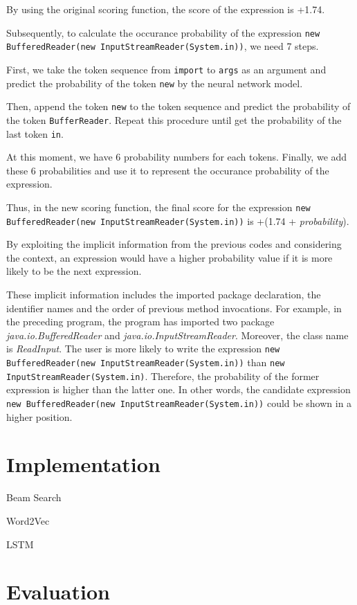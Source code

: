 \documentclass[PRO,english]{ipsj}
\begin{document}
By using the original scoring function, the score of the expression is +1.74. 

Subsequently, to calculate the occurance probability of the expression \texttt{new BufferedReader(new InputStreamReader(System.in))}, we need 7 steps. 

First, we take the token sequence from \texttt{import} to \texttt{args} as an argument and predict the probability of the token \texttt{new} by the neural network model. 

Then, append the token \texttt{new} to the token sequence and predict the probability of the token \texttt{BufferReader}. Repeat this procedure until get the probability of the last token \texttt{in}. 

At this moment, we have 6 probability numbers for each tokens.  Finally, we add these 6 probabilities and use it to represent the occurance probability of the expression.

Thus, in the new scoring function, the final score for the expression \texttt{new BufferedReader(new InputStreamReader(System.in))} is +(1.74 + \textit{probability}).

By exploiting the implicit information from the previous codes and considering the context, an expression would have a higher probability value if it is more likely to be the next expression. 

These implicit information includes the imported package declaration, the identifier names and the order of previous method invocations. For example, in the preceding program, the program has imported two package \textit{java.io.BufferedReader} and \textit{java.io.InputStreamReader}. Moreover, the class name is \textit{ReadInput}. The user is more likely to write the expression \texttt{new BufferedReader(new InputStreamReader(System.in))} than \texttt{new InputStreamReader(System.in)}. Therefore, the probability of the former expression is higher than the latter one. In other words, the candidate expression \texttt{new BufferedReader(new InputStreamReader(System.in))} could be shown in a higher position.


\section{Implementation}

Beam Search

Word2Vec

LSTM

\section{Evaluation}
\end{document}
